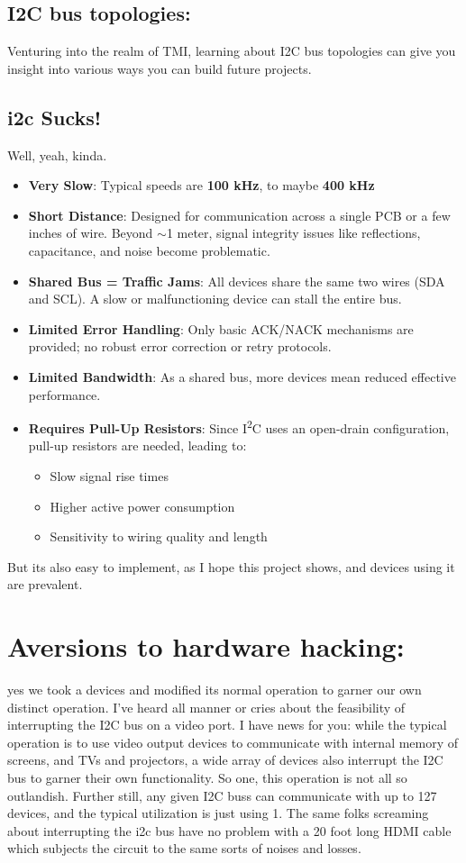 \documentclass[]{article}
\begin{document}
\subsection{I2C bus topologies:}
Venturing into the realm of TMI, learning about I2C bus topologies can give you insight into various ways you can build future projects. 

\subsection{i2c Sucks!} Well, yeah, kinda.
\begin{itemize}
	\item \textbf{Very Slow}: Typical speeds are \textbf{100 kHz}, to maybe \textbf{400 kHz}
	\item \textbf{Short Distance}: Designed for communication across a single PCB or a few inches of wire. Beyond $\sim$1 meter, signal integrity issues like reflections, capacitance, and noise become problematic.
	\item \textbf{Shared Bus = Traffic Jams}: All devices share the same two wires (SDA and SCL). A slow or malfunctioning device can stall the entire bus.
	\item \textbf{Limited Error Handling}: Only basic ACK/NACK mechanisms are provided; no robust error correction or retry protocols.
	\item \textbf{Limited Bandwidth}: As a shared bus, more devices mean reduced effective performance.
	\item \textbf{Requires Pull-Up Resistors}: Since I\textsuperscript{2}C uses an open-drain configuration, pull-up resistors are needed, leading to:
	\begin{itemize}
		\item Slow signal rise times
		\item Higher active power consumption
		\item Sensitivity to wiring quality and length
	\end{itemize}
\end{itemize} 
But its also easy to implement, as I hope this project shows, and devices using it are prevalent. 

\section{Aversions to hardware hacking:} yes we took a devices and modified its normal operation to garner our own distinct operation. I've heard all manner or cries about the feasibility of interrupting the I2C bus on a video port. I have news for you: while the typical operation is to use video output devices to communicate with internal memory of screens, and TVs and projectors, a wide array of devices also interrupt the I2C bus to garner their own functionality. So one, this operation is not all so outlandish. Further still, any given I2C buss can communicate with up to 127 devices, and the typical utilization is just using 1. The same folks screaming about interrupting the i2c bus have no problem with a 20 foot long HDMI cable which subjects the circuit to the same sorts of noises and losses.  
\end{document}

